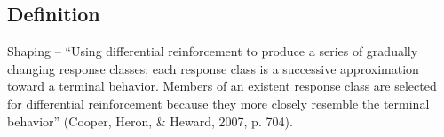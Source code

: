 \subsection{Definition}
Shaping – ``Using differential reinforcement to produce a series of gradually changing response classes; each response class is a successive approximation toward a terminal behavior.  Members of an existent response class are selected for differential reinforcement because they more closely resemble the terminal behavior'' (Cooper, Heron, \& Heward, 2007, p. 704).
% 
